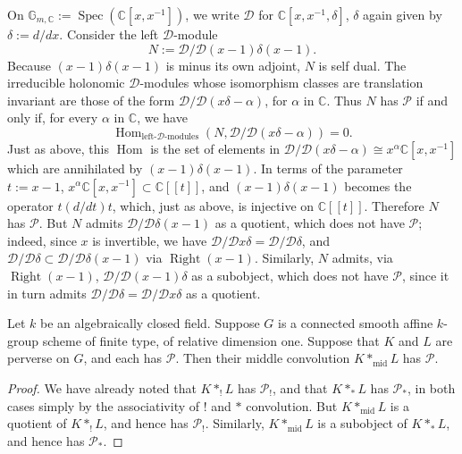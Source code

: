On \(\mathbb{G}_{m,\mathbb{C}}:=\operatorname{Spec}(\mathbb{C}[x,x^{-1}])\),
we write \(\mathcal{D}\) for \(\mathbb{C}[x,x^{-1},\delta]\), \(\delta\) again
given by \(\delta:=d/dx\). Consider the left \(\mathcal{D}\)-module
\[
  N:=\mathcal{D}/\mathcal{D}(x-1)\delta(x-1).
\]
Because \((x-1)\delta(x-1)\) is minus its own adjoint, \(N\) is self dual. The
irreducible holonomic \(\mathcal{D}\)-modules whose isomorphism classes are
translation invariant are those of the form
\(\mathcal{D}/\mathcal{D}(x\delta-\alpha)\), for \(\alpha\) in
\(\mathbb{C}\). Thus \(N\) has \(\mathcal{P}\) if and only if, for every
\(\alpha\) in \(\mathbb{C}\), we have
\[
  \operatorname{Hom}_{\text{left-}\mathcal{D}\text{-modules}}
  (N,\mathcal{D}/\mathcal{D}(x\delta-\alpha))=0.
\]
Just as above, this \(\operatorname{Hom}\) is the set of elements in
\(\mathcal{D}/\mathcal{D}(x\delta-\alpha)\cong x^\alpha\mathbb{C}[x,x^{-1}]\)
which are annihilated by \((x-1)\delta(x-1)\). In terms of the parameter
\(t:=x-1\), \(x^\alpha\mathbb{C}[x,x^{-1}]\subset\mathbb{C}[[t]]\), and
\((x-1)\delta(x-1)\) becomes the operator \(t(d/dt)t\), which, just as above,
is injective on \(\mathbb{C}[[t]]\). Therefore \(N\) has \(\mathcal{P}\). But
\(N\) admits \(\mathcal{D}/\mathcal{D}\delta(x-1)\) as a quotient, which does
not have \(\mathcal{P}\); indeed, since \(x\) is invertible, we have
\(\mathcal{D}/\mathcal{D}x\delta=\mathcal{D}/\mathcal{D}\delta\), and
\(\mathcal{D}/\mathcal{D}\delta\subset\mathcal{D}/\mathcal{D}\delta(x-1)\) via
\(\operatorname{Right}(x-1)\). Similarly, \(N\) admits, via
\(\operatorname{Right}(x-1)\), \(\mathcal{D}/\mathcal{D}(x-1)\delta\) as a
subobject, which does not have \(\mathcal{P}\), since it in turn admits
\(\mathcal{D}/\mathcal{D}\delta=\mathcal{D}/\mathcal{D}x\delta\) as a quotient.

Let \(k\) be an algebraically closed field. Suppose \(G\) is a connected smooth
affine \(k\)-group scheme of finite type, of relative dimension one. Suppose
that \(K\) and \(L\) are perverse on \(G\), and each has \(\mathcal{P}\). Then
their middle convolution \(K*_{\mathrm{mid}}L\) has \(\mathcal{P}\).

\begin{proof}
We have already noted that \(K*_!L\) has \(\mathcal{P}_!\), and that
\(K*_*L\) has \(\mathcal{P}_*\), in both cases simply by the associativity of
\(!\) and \(*\) convolution. But \(K*_{\mathrm{mid}}L\) is a quotient of
\(K*_!L\), and hence has \(\mathcal{P}_!\). Similarly,
\(K*_{\mathrm{mid}}L\) is a subobject of \(K*_*L\), and hence has
\(\mathcal{P}_*\).
\end{proof}

